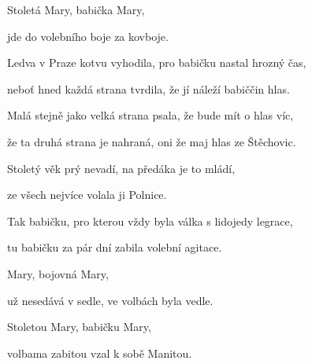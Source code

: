 Stoletá Mary, babička Mary,

jde do volebního boje za kovboje.
\kr

\zs
Ledva v Praze kotvu vyhodila, pro babičku nastal hrozný čas,

neboť hned každá strana tvrdila, že jí náleží babiččin hlas.

\bigskip

Malá stejně jako velká strana psala, že bude mít o hlas víc,

že ta druhá strana je nahraná, oni že maj hlas ze Štěchovic.

\bigskip

Stoletý věk prý nevadí, na předáka je to mládí,

ze všech nejvíce volala ji Polnice.

\bigskip

Tak babičku, pro kterou vždy byla válka s lidojedy legrace,

tu babičku za pár dní zabila volební agitace.
\ks

\zr
Mary, bojovná Mary,

už nesedává v sedle, ve volbách byla vedle.

Stoletou Mary, babičku Mary,

volbama zabitou vzal k sobě Manitou.
\kr
\kp
